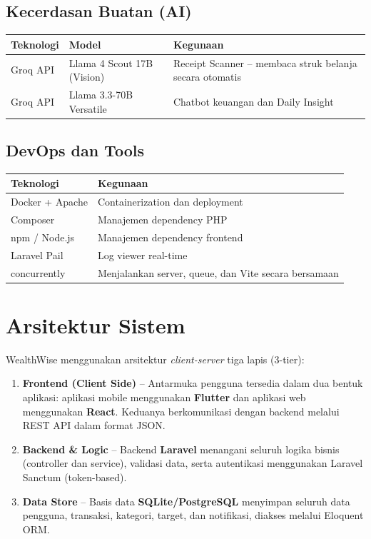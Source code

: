 \documentclass[11pt]{article}
\begin{document}
\subsection{Kecerdasan Buatan (AI)}
\begin{table}[h]
\centering
\begin{tabular}{@{}p{3cm}p{4.5cm}p{6cm}@{}}
\toprule
\textbf{Teknologi} & \textbf{Model} & \textbf{Kegunaan} \\
\midrule
Groq API & Llama 4 Scout 17B (Vision) & Receipt Scanner -- membaca struk belanja secara otomatis \\
Groq API & Llama 3.3-70B Versatile & Chatbot keuangan dan Daily Insight \\
\bottomrule
\end{tabular}
\end{table}

\subsection{DevOps dan Tools}
\begin{table}[h]
\centering
\begin{tabular}{@{}p{4cm}p{9.5cm}@{}}
\toprule
\textbf{Teknologi} & \textbf{Kegunaan} \\
\midrule
Docker + Apache & Containerization dan deployment \\
Composer & Manajemen dependency PHP \\
npm / Node.js & Manajemen dependency frontend \\
Laravel Pail & Log viewer real-time \\
concurrently & Menjalankan server, queue, dan Vite secara bersamaan \\
\bottomrule
\end{tabular}
\end{table}

\newpage
\section{Arsitektur Sistem}

WealthWise menggunakan arsitektur \textit{client-server} tiga lapis (3-tier):
\begin{enumerate}
\item \textbf{Frontend (Client Side)} -- Antarmuka pengguna tersedia dalam dua bentuk aplikasi: aplikasi mobile menggunakan \textbf{Flutter} dan aplikasi web menggunakan \textbf{React}. Keduanya berkomunikasi dengan backend melalui REST API dalam format JSON.
\item \textbf{Backend \& Logic} -- Backend \textbf{Laravel} menangani seluruh logika bisnis (controller dan service), validasi data, serta autentikasi menggunakan Laravel Sanctum (token-based).
\item \textbf{Data Store} -- Basis data \textbf{SQLite/PostgreSQL} menyimpan seluruh data pengguna, transaksi, kategori, target, dan notifikasi, diakses melalui Eloquent ORM.
\end{enumerate}
\end{document}
